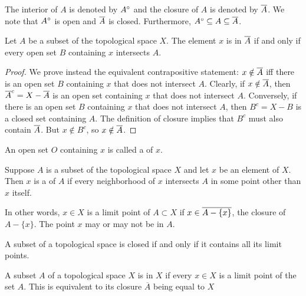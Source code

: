 The interior of $A$ is denoted by ${A}^{\circ}$ and the closure of $A$ is denoted by $\overline{A}$.
We note that ${A}^{\circ}$ is open and $\overline{A}$ is closed.
Furthermore, ${A}^{\circ} \subseteq A \subseteq \overline{A}$.

\begin{theorem} \label{theorem:ClosureConditions}
Let $A$ be a subset of the topological space $X$.
The element $x$ is in $\overline{A}$ if and only if every open set $B$ containing $x$ intersects $A$.
\end{theorem}
\begin{proof}
We prove instead the equivalent contrapositive statement: $x \notin \overline{A}$ iff there is an open set $B$ containing $x$ that does not intersect $A$.
Clearly, if  $x \notin \overline{A}$, then $\overline{A}^c = X - \overline{A}$ is an open set containing $x$ that does not intersect $A$.
Conversely, if there is an open set $B$ containing $x$ that does not intersect $A$, then $B^c = X-B$ is a closed set containing $A$.
The definition of closure implies that $B^c$ must also contain $\overline{A}$.
But $x \notin B^c$, so $x\notin \overline{A}$.
\end{proof}

\begin{definition}
An open set $O$ containing $x$ is called a  of $x$.
\end{definition}

\begin{definition}
Suppose $A$ is a subset of the topological space $X$ and let $x$ be an element of $X$.
Then $x$ is a  of $A$ if every neighborhood of $x$ intersects $A$ in some point other than $x$ itself.
\end{definition}

In other words, $x \in X$ is a limit point of $A \subset X$ if $x \in \overline{A - \{ x \}}$, the closure of $A - \{ x \}$.
The point $x$ may or may not be in $A$.

\begin{theorem}
A subset of a topological space is closed if and only if it contains all its limit points.
\end{theorem}

\begin{definition}
A subset $A$ of a topological space $X$ is  in $X$ if every $x\in X$ is a limit point of the set $A$.
This is equivalent to its closure $\overline{A}$ being equal to $X$
\end{definition}

